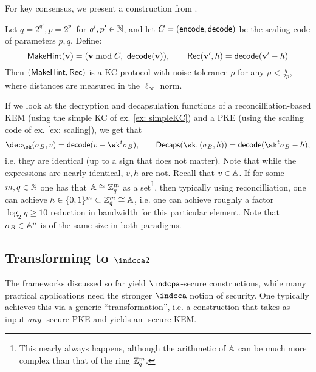 For key consensus, we present a construction 
from \cite{EPRINT:JinZha17}.
\begin{example}[``Simple'' KC]\label{ex: simpleKC}
	Let $q = 2^{q'}, p= 2^{p'}$ for $q', p'\in\mathbb{N}$, and let $C = (\mathsf{encode}, \mathsf{decode})$ be the scaling code of parameters $p, q$.
	Define:
	\begin{equation*}
	\mathsf{MakeHint}(\mathbf{v}) = ( \mathbf{v}\bmod C,\ \mathsf{decode}(\mathbf{v})),\qquad \mathsf{Rec}(\mathbf{v}', h) = 
	\mathsf{decode}(\mathbf{v}' - h)
	\end{equation*}
	Then $(\mathsf{MakeHint}, \mathsf{Rec})$ is a KC protocol with noise tolerance $\rho$ for any $\rho < \frac{q}{2p}$, where distances are measured in the $\ell_\infty$ norm.
\end{example}
If we look at the decryption and decapsulation functions of a reconcilliation-based KEM (using the simple KC of ex. \ref{ex: simpleKC})  and a PKE (using the scaling code of ex. \ref{ex: scaling}), we get that
\begin{equation*}
\dec_{\sk}(\sigma_B, v) = \decode(v - \sk^t\sigma_B),\qquad \decaps(\sk, (\sigma_B, h)) = \decode(\sk^t\sigma_B - h),
\end{equation*}
i.e. they are identical (up to a sign that does not matter).
Note that while the expressions are nearly identical, $v, h$ are not.
Recall that $v\in \mathbb{A}$.
If for some $m, q\in\mathbb{N}$ one has that $\mathbb{A}\cong \mathbb{Z}_q^m$ as a set\footnote{This nearly always happens, although the arithmetic of $\mathbb{A}$ can be much more complex than that of the ring $\mathbb{Z}_q^m$.}, then typically using reconcilliation, one can achieve $h\in\{0,1\}^{m}\subset \mathbb{Z}_q^{m}\cong \mathbb{A}$, i.e. one can achieve roughly a factor $\log_2 q\geq 10$ reduction in bandwidth for this particular element.
Note that $\sigma_B\in\mathbb{A}^n$ is of the same size in both paradigms.


\subsection{Transforming to $\indcca2$}\label{ssec: fo-transform}
The frameworks discussed so far yield $\indcpa$-secure constructions, while many practical applications need the stronger $\indcca$ notion of security.
One typically achieves this via a generic ``transformation'', i.e. a construction that takes as input \emph{any} \indcpa-secure PKE and yields an \indcca-secure KEM.

